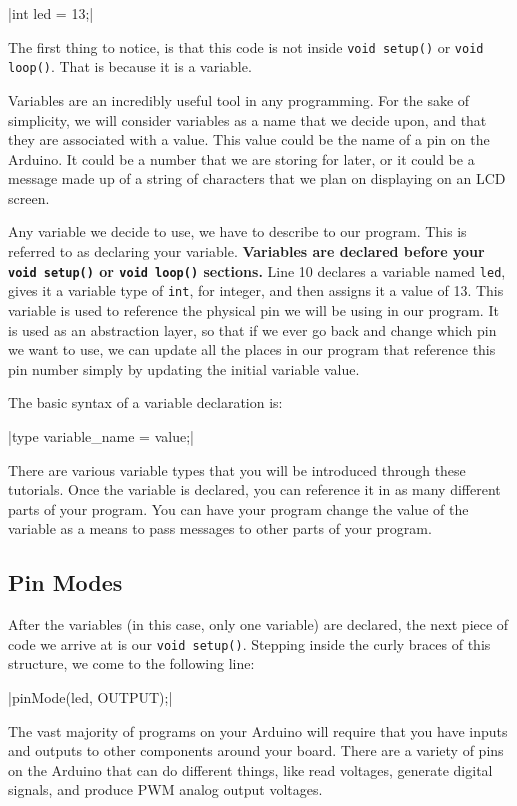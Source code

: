 \documentclass[11pt,a4paper]{article}
\begin{document}
|int led = 13;|

The first thing to notice, is that this code is not inside \texttt{void setup()} or \texttt{void loop()}.  That is because it is a variable. 


Variables are an incredibly useful tool in any programming.  For the sake of simplicity, we will consider variables as a name that we decide upon, and that they are associated with a value.  This value could be the name of a pin on the Arduino.  It could be a number that we are storing for later, or it could be a message made up of a string of characters that we plan on displaying on an LCD screen. 

Any variable we decide to use, we have to describe to our program.  This is referred to as declaring your variable.  \textbf{Variables are declared before your \texttt{void setup()} or \texttt{void loop()} sections.}  Line 10 declares a variable named \texttt{led}, gives it a variable type of \texttt{int}, for integer, and then assigns it a value of 13.  This variable is used to reference the physical pin we will be using in our program.  It is used as an abstraction layer, so that if we ever go back and change which pin we want to use, we can update all the places in our program that reference this pin number simply by updating the initial variable value.

The basic syntax of a variable declaration is: 

|type variable_name = value;|

There are various variable types that you will be introduced through these tutorials.  Once the variable is declared, you can reference it in as many different parts of your program.  You can have your program change the value of the variable as a means to pass messages to other parts of your program.


\subsection{Pin Modes} %
\label{sub:pin_modes}

After the variables (in this case, only one variable) are declared, the next piece of code we arrive at is our \texttt{void setup()}.  Stepping inside the curly braces of this structure, we come to the following line:

|pinMode(led, OUTPUT);|

The vast majority of programs on your Arduino will require that you have inputs and outputs to other components around your board.  There are a variety of pins on the Arduino that can do different things, like read voltages, generate digital signals, and produce PWM analog output voltages.  
\end{document}
